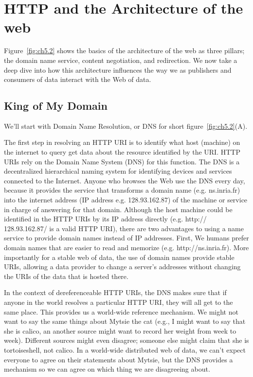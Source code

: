 \section{HTTP and the Architecture of the web}

Figure~\ref{fig:ch5.2} shows the basics of the architecture of the web as three pillars; the domain name service, content negotiation, and redirection.  We now take a deep dive into how this architecture influences the way we as  publishers and consumers of data interact with the Web of data. 

\hypertarget{king-of-my-domain}{%
\subsection{King of My Domain}\label{king-of-my-domain}}

We'll start with Domain Name Resolution, or DNS for short  figure~\ref{fig:ch5.2}(A). 

The first step in resolving an HTTP URI is to identify what host (machine) on the internet 
to query get data about the resource identified by the URI. HTTP URIs rely on the Domain Name System (DNS) for this function.
The DNS is a decentralized hierarchical naming system for identifying
devices and services connected to the
Internet. Anyone who browses the Web use the DNS every day, because it provides the service that
transforms a domain name (e.g. ns.inria.fr)
into the internet address (IP address e.g. 128.93.162.87) of the machine
or service in charge of answering for that domain.  Although the host
machine could be identified in the HTTP URIs by its IP address directly
(e.g. http:// 128.93.162.87/ is a valid HTTP URI), there are two advantages to 
using a name service to provide domain names instead of IP addresses.  First, We humans prefer
domain names that are easier to read and memorize (e.g.
http://ns.inria.fr).   More importantly for a stable web of data, the use of domain names 
provide stable URIs, allowing a data provider to change a server's
addresses without changing the URIs of the data that is hosted there.


In the context of dereferenceable HTTP URIs, the DNS
makes sure that if anyone in the world resolves a particular HTTP URI, they
will all get to the same place.   This provides us a world-wide reference mechanism.  We 
might not want to say the same things about Mytsie the cat 
(e.g., I might want to say that she 
is calico, an another source might want to record her weight from week to week).  
Different sources might even disagree; someone else might claim that she is tortoiseshell, 
not calico.  In a world-wide distributed web of data, we can't expect everyone to agree on 
their statements
about Mytsie, but the DNS provides a mechanism so we can agree on which thing we are 
disagreeing about.


